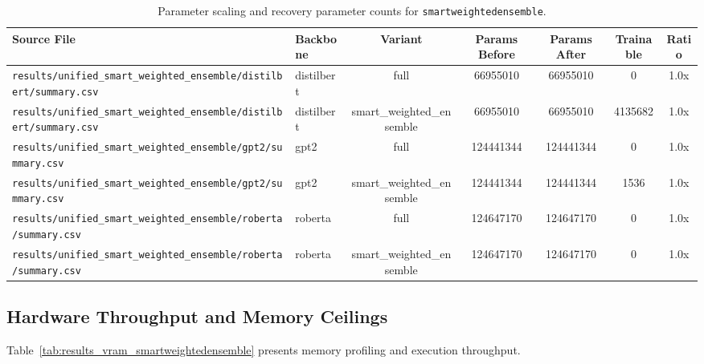 \begin{table}[t]
\centering
\small
\begin{tabular}{llccccc}
\toprule
\textbf{Source File} & \textbf{Backbone} & \textbf{Variant} & \textbf{Params Before} & \textbf{Params After} & \textbf{Trainable} & \textbf{Ratio} \\
\midrule
\texttt{results/unified\_smart\_weighted\_ensemble/distilbert/summary.csv} & distilbert & full & 66955010 & 66955010 & 0 & 1.0x \\
\texttt{results/unified\_smart\_weighted\_ensemble/distilbert/summary.csv} & distilbert & smart\_weighted\_ensemble & 66955010 & 66955010 & 4135682 & 1.0x \\
\texttt{results/unified\_smart\_weighted\_ensemble/gpt2/summary.csv} & gpt2 & full & 124441344 & 124441344 & 0 & 1.0x \\
\texttt{results/unified\_smart\_weighted\_ensemble/gpt2/summary.csv} & gpt2 & smart\_weighted\_ensemble & 124441344 & 124441344 & 1536 & 1.0x \\
\texttt{results/unified\_smart\_weighted\_ensemble/roberta/summary.csv} & roberta & full & 124647170 & 124647170 & 0 & 1.0x \\
\texttt{results/unified\_smart\_weighted\_ensemble/roberta/summary.csv} & roberta & smart\_weighted\_ensemble & 124647170 & 124647170 & 0 & 1.0x \\
\bottomrule
\end{tabular}
\caption{Parameter scaling and recovery parameter counts for \texttt{smartweightedensemble}.}
\label{tab:results_params_smartweightedensemble}
\end{table}

\subsection{Hardware Throughput and Memory Ceilings}
Table~\ref{tab:results_vram_smartweightedensemble} presents memory profiling and execution throughput.

